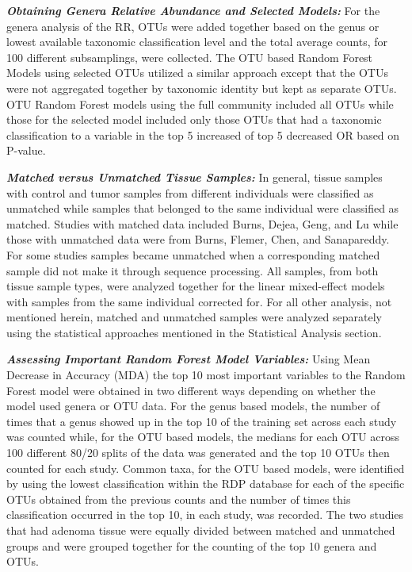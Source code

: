 \documentclass[12pt,]{article}
\begin{document}
\textbf{\emph{Obtaining Genera Relative Abundance and Selected Models:}}
For the genera analysis of the RR, OTUs were added together based on the
genus or lowest available taxonomic classification level and the total
average counts, for 100 different subsamplings, were collected. The OTU
based Random Forest Models using selected OTUs utilized a similar
approach except that the OTUs were not aggregated together by taxonomic
identity but kept as separate OTUs. OTU Random Forest models using the
full community included all OTUs while those for the selected model
included only those OTUs that had a taxonomic classification to a
variable in the top 5 increased of top 5 decreased OR based on P-value.

\textbf{\emph{Matched versus Unmatched Tissue Samples:}} In general,
tissue samples with control and tumor samples from different individuals
were classified as unmatched while samples that belonged to the same
individual were classified as matched. Studies with matched data
included Burns, Dejea, Geng, and Lu while those with unmatched data were
from Burns, Flemer, Chen, and Sanapareddy. For some studies samples
became unmatched when a corresponding matched sample did not make it
through sequence processing. All samples, from both tissue sample types,
were analyzed together for the linear mixed-effect models with samples
from the same individual corrected for. For all other analysis, not
mentioned herein, matched and unmatched samples were analyzed separately
using the statistical approaches mentioned in the Statistical Analysis
section.

\textbf{\emph{Assessing Important Random Forest Model Variables:}} Using
Mean Decrease in Accuracy (MDA) the top 10 most important variables to
the Random Forest model were obtained in two different ways depending on
whether the model used genera or OTU data. For the genus based models,
the number of times that a genus showed up in the top 10 of the training
set across each study was counted while, for the OTU based models, the
medians for each OTU across 100 different 80/20 splits of the data was
generated and the top 10 OTUs then counted for each study. Common taxa,
for the OTU based models, were identified by using the lowest
classification within the RDP database for each of the specific OTUs
obtained from the previous counts and the number of times this
classification occurred in the top 10, in each study, was recorded. The
two studies that had adenoma tissue were equally divided between matched
and unmatched groups and were grouped together for the counting of the
top 10 genera and OTUs.
\end{document}
